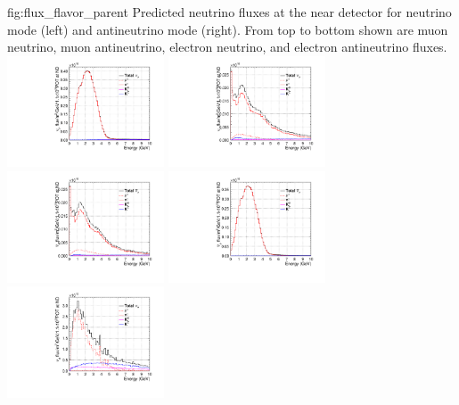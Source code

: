 \begin{dunefigure}{fig:flux_flavor_parent}
{Predicted neutrino fluxes at the near detector for neutrino mode (left) and antineutrino mode (right). From top to bottom shown are muon neutrino, muon antineutrino, electron neutrino, and electron antineutrino fluxes.}
    \includegraphics[width=0.35\textwidth]{graphics/dune_neutrino_nd_numu.pdf}
     \includegraphics[width=0.35\textwidth]{graphics/dune_antineutrino_nd_numu.pdf}
    \includegraphics[width=0.35\textwidth]{graphics/dune_neutrino_nd_numubar.pdf}
     \includegraphics[width=0.35\textwidth]{graphics/dune_antineutrino_nd_numubar.pdf}
    \includegraphics[width=0.35\textwidth]{graphics/dune_neutrino_nd_nue.pdf}

\end{dunefigure}
